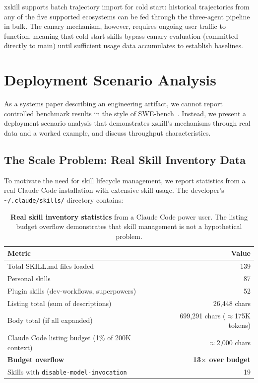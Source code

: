 \documentclass[11pt]{article}
\begin{document}
xskill supports batch trajectory import for cold start: historical trajectories from any of the five supported ecosystems can be fed through the three-agent pipeline in bulk. The canary mechanism, however, requires ongoing user traffic to function, meaning that cold-start skills bypass canary evaluation (committed directly to main) until sufficient usage data accumulates to establish baselines.


\section{Deployment Scenario Analysis}
\label{sec:evaluation}

As a systems paper describing an engineering artifact, we cannot report controlled benchmark results in the style of SWE-bench~\citep{jimenez2024swebench}. Instead, we present a deployment scenario analysis that demonstrates xskill's mechanisms through real data and a worked example, and discuss throughput characteristics.

\subsection{The Scale Problem: Real Skill Inventory Data}

To motivate the need for skill lifecycle management, we report statistics from a real Claude Code installation with extensive skill usage. The developer's \texttt{\~{}/.claude/skills/} directory contains:

\begin{table}[h]
\centering
\caption{\textbf{Real skill inventory statistics} from a Claude Code power user. The listing budget overflow demonstrates that skill management is not a hypothetical problem.}
\label{tab:inventory}
\small
\begin{tabular}{@{}lr@{}}
\toprule
\textbf{Metric} & \textbf{Value} \\
\midrule
Total SKILL.md files loaded & 139 \\
\quad Personal skills & 87 \\
\quad Plugin skills (dev-workflows, superpowers) & 52 \\
Listing total (sum of descriptions) & 26,448 chars \\
Body total (if all expanded) & 699,291 chars ($\approx$175K tokens) \\
Claude Code listing budget (1\% of 200K context) & $\approx$2,000 chars \\
\textbf{Budget overflow} & \textbf{13$\times$ over budget} \\
Skills with \texttt{disable-model-invocation} & 19 \\
\bottomrule
\end{tabular}
\end{table}
\end{document}
